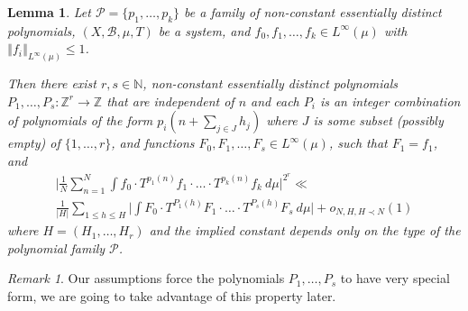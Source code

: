 \documentclass[11pt]{amsart}
\newcommand{\N}{\mathbb{N}}
\newcommand{\Z}{\mathbb{Z}}
\newcommand{\norm}[1]{\left\Vert #1\right\Vert}
\theoremstyle{plain}
\newtheorem{lemma}[theorem]{Lemma}
\theoremstyle{definition}
\theoremstyle{remark}
\newtheorem*{remark}{Remark}
\begin{document}
\begin{lemma} \label{L:VDCmain} Let $\mathcal{P}=\{p_1,\ldots,p_k\}$ be a family
  of non-constant essentially distinct polynomials, $(X,\mathcal{B},\mu,T)$ be a
  system, and $f_0,f_1, \ldots, f_k\in L^\infty(\mu)$ with
  $\norm{f_i}_{L^\infty(\mu)}\leq 1$.

  Then there exist $r,s \in \N$, non-constant
  essentially distinct polynomials $P_1,\ldots,P_s\colon \Z^r\to \Z$
  that are  independent of $n$ and each $P_i$ is an integer combination of polynomials of the form
  $p_i(n+\sum_{j\in J}h_j)$ where $J$ is some subset (possibly empty) of
  $\{1,\ldots,r\}$,
  and functions $F_0,F_1,\ldots,F_s\in L^\infty(\mu)$, such that
  $F_1=f_1$, and
  \begin{multline*}
    \Big| \frac{1}{N}\sum_{n=1}^N \int f_0\cdot
    T^{p_1(n)}f_1\cdot \ldots\cdot
    T^{p_k(n)}f_k \ d\mu \Big|^{2^r}\ll\\
    \frac{1}{|H|}\sum_{1\leq h\leq H}\Big|\int F_0 \cdot
    T^{P_1(h)}F_1\cdot \ldots\cdot T^{P_s(h)}F_s \ d\mu \Big| +o_{N,H,
      H\prec N}(1)
  \end{multline*}
  where $H=(H_1,\ldots,H_r)$ and the implied constant depends only on the type of
  the polynomial family  $\mathcal{P}$.
\end{lemma}
\begin{remark}
 Our assumptions force the polynomials $P_1,\ldots,P_s$
to have very special form, we are going to take advantage of this  property  later.
\end{remark}
\end{document}

